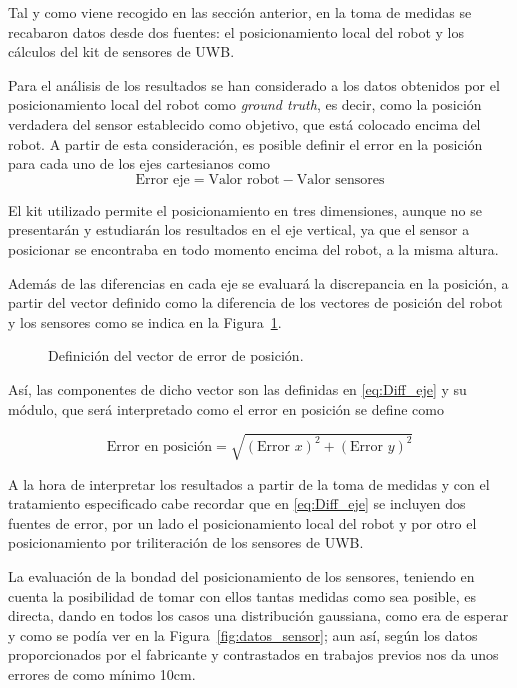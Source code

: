 Tal y como viene recogido en las sección anterior, en la toma de medidas se recabaron datos desde dos fuentes: el posicionamiento local del robot y los cálculos del kit de sensores de UWB.

Para el análisis de los resultados se han considerado a los datos obtenidos por el posicionamiento local del robot como \textit{ground truth}, es decir, como la posición verdadera del sensor establecido como objetivo, que está colocado encima del robot.
A partir de esta consideración, es posible definir el error en la posición para cada uno de los ejes cartesianos como
\begin{equation}\label{eq:Diff_eje}
    \text{Error eje} = \text{Valor robot} - \text{Valor sensores}
\end{equation}

El kit utilizado permite el posicionamiento en tres dimensiones, aunque no se presentarán y estudiarán los resultados en el eje vertical, ya que el sensor a posicionar se encontraba en todo momento encima del robot, a la misma altura.

Además de las diferencias en cada eje se evaluará la discrepancia en la posición, a partir del vector definido como la diferencia de los vectores de posición del robot y los sensores como se indica en la Figura~\ref{fig:diff_pos}.
\begin{figure}[H]
    \centering
    
    \caption{Definición del vector de error de posición.}
    \label{fig:diff_pos}
\end{figure}

Así, las componentes de dicho vector son las definidas en \eqref{eq:Diff_eje} y su módulo, que será interpretado como el error en posición se define como

\begin{equation}\label{eq:vec_pos}
    \text{Error en posición} = \sqrt{(\text{Error } x)^2 + (\text{Error } y)^2}
\end{equation}

A la hora de interpretar los resultados a partir de la toma de medidas y con el tratamiento especificado cabe recordar que en \eqref{eq:Diff_eje} se incluyen dos fuentes de error, por un lado el posicionamiento local del robot y por otro el posicionamiento por triliteración de los sensores de UWB.

La evaluación de la bondad del posicionamiento de los sensores, teniendo en cuenta la posibilidad de tomar con ellos tantas medidas como sea posible, es directa, dando en todos los casos una distribución gaussiana, como era de esperar y como se podía ver en la Figura~\ref{fig:datos_sensor}; aun así, según los datos proporcionados por el fabricante y contrastados en trabajos previos nos da unos errores de como mínimo 10cm.

